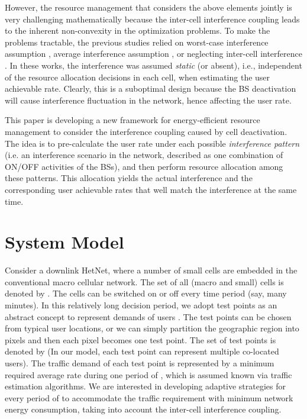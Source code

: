 \documentclass{article}
\begin{document}
However, the resource management that considers the above elements
jointly is very challenging mathematically because the inter-cell
interference coupling leads to the inherent non-convexity in the
optimization problems. To make the problems tractable, the previous
studies relied on worst-case interference assumption
\cite{Pollakis2012,Cavalcante2014a}, average interference assumption
\cite{Son2011a,Kim2013a}, or neglecting inter-cell interference
\cite{Su2013}. In these works, the interference was assumed
\emph{static} (or absent), i.e., independent of the resource
allocation decisions in each cell, when estimating the user achievable
rate. Clearly, this is a suboptimal design because the BS deactivation
will cause interference fluctuation in the network, hence affecting
the user rate.


This paper is developing a new framework for energy-efficient resource
management to consider the interference coupling caused by cell
deactivation. The idea is to pre-calculate the user rate under each
possible \emph{interference pattern} (i.e. an interference scenario in
the network, described as one combination of ON/OFF activities of the
BSs), and then perform resource allocation among these patterns. This
allocation yields the actual interference and the corresponding user
achievable rates that well match the interference at the same time.





\section{System Model}
\label{sec:system-model}

Consider a downlink HetNet, where a number of small cells are embedded
in the conventional macro cellular network. The set of all (macro and
small) cells is denoted by . The
cells can be switched on or off every time period  (say, many
minutes). In this relatively long decision period, we adopt test
points as an abstract concept to represent demands of users
\cite{Cavalcante2014a}. The test points can be chosen from typical
user locations, or we can simply partition the geographic region into
pixels and then each pixel becomes one test point.  The set of test
points is denoted by  (In our model,
each test point can represent multiple co-located users). The traffic
demand of each test point  is represented by a
minimum required average rate  during one period of , which is
assumed known via traffic estimation algorithms.  We are interested in
developing adaptive strategies for every period of  to accommodate
the traffic requirement with minimum network energy consumption,
taking into account the inter-cell interference coupling.
\end{document}
